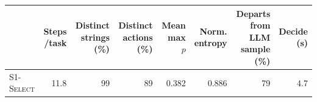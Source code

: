 \begin{tabular}{@{}lrrrrrrr@{}}\toprule
& \shortstack{Steps\\/task} & \shortstack{Distinct\\strings (\%)} & \shortstack{Distinct\\actions (\%)} & \shortstack{Mean\\max $p$} & \shortstack{Norm.\\entropy} & \shortstack{Departs from\\LLM sample (\%)} & \shortstack{Decide\\(s)} \\\midrule
\textsc{S1-Select} & 11.8 & 99 & 89 & 0.382 & 0.886 & 79 & 4.7 \\
\bottomrule\end{tabular}
